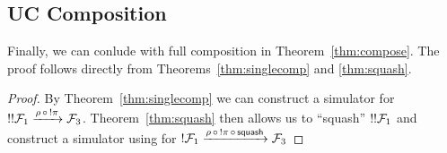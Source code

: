 \subsection{UC Composition}
Finally, we can conlude with full composition in Theorem~\ref{thm:compose}.
The proof follows directly from Theorems~\ref{thm:singlecomp} and \ref{thm:squash}.

\begin{proof}
By Theorem~\ref{thm:singlecomp} we can construct a simulator  for $!!\mathcal{F}_1 \xrightarrow{\rho \, \circ \, !\pi} \mathcal{F}_3$.
Theorem~\ref{thm:squash} then allows us to ``squash'' $!!\mathcal{F}_1$ and construct a simulator using  for $!\mathcal{F}_1 \xrightarrow{\rho \, \circ \, !\pi \, \circ \, {\mathsf {squash}}} \mathcal{F}_3$
\end{proof}



